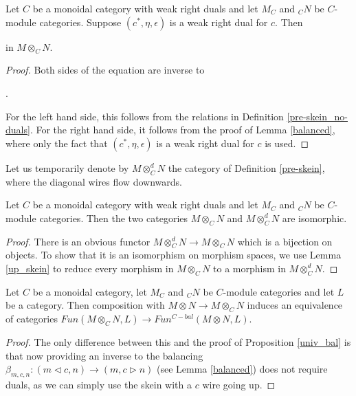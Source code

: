 \begin{lemma}\label{up_skein}
  
Let $C$ be a monoidal category with weak right duals and let $M_C$ and $_{C}N$ be $C$-module categories. Suppose $(c^*,\eta,\epsilon)$ is a weak right dual for $c$. Then \begin{center}\end{center} in $M\otimes_C N$.
\end{lemma}

\begin{proof} Both sides of the equation are inverse to \begin{center}.\end{center} For the left hand side, this follows from the relations in Definition \ref{pre-skein_no-duals}. For the right hand side, it follows from the proof of Lemma \ref{balanced}, where only the fact that $(c^*,\eta,\epsilon)$ is a weak right dual for $c$ is used.\end{proof}

Let us temporarily denote by $M\otimes_C^d N$ the category of Definition \ref{pre-skein}, where the diagonal wires flow downwards.

\begin{lemma}
  
Let $C$ be a monoidal category with weak right duals and let $M_C$ and $_{C}N$ be $C$-module categories. Then the two categories $M\otimes_C N$ and $M\otimes^{d}_C N$ are isomorphic.\end{lemma}
\begin{proof}

There is an obvious functor $M\otimes_C^d N\to M\otimes_C N$ which is a bijection on objects. To show that it is an isomorphism on morphism spaces, we use Lemma \ref{up_skein} to reduce every morphism in $M\otimes_C N$ to a morphism in $M\otimes^d_C N$.\end{proof}


\begin{proposition}
Let $C$ be a monoidal category, let $M_C$ and $_{C}N$ be $C$-module categories and let $L$ be a category. Then composition with
  $M\otimes N \to M\otimes_C N$ induces an equivalence of categories
  $Fun(M\otimes_C N,L)\to Fun^{C-bal}(M\otimes N,L)$.\end{proposition}
\begin{proof}
  The only difference between this and the proof of Proposition \ref{univ_bal} is that now providing an inverse to the balancing $\beta_{m,c,n}:(m\lhd c, n)\to (m,c\rhd n)$ (see Lemma \ref{balanced}) does not require duals, as we can simply use the skein with a $c$ wire going up.\end{proof}
  
